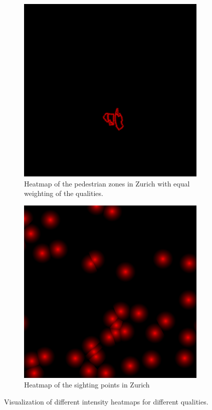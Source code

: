 \documentclass[letterpaper]{article}
\begin{document}
\begin{figure}
    \begin{subfigure}{.22\textwidth}
        \centering
        \includegraphics[width=.95\linewidth]{images/results/pedestrian_zone_heatmap_70.png}
        \caption[width=.2\textwidth]{Heatmap of the pedestrian zones in Zurich with equal weighting of the qualities.}
    \end{subfigure}%
    \begin{subfigure}{.22\textwidth}
        \centering
        \includegraphics[width=.95\linewidth]{images/results/sighting_point_heatmap_500.png}
        \caption[width=.2\textwidth]{Heatmap of the sighting points in Zurich}
    \end{subfigure}
    \caption{Visualization of different intensity heatmaps for different qualities.}
    \label{fig:ZurichSingleHeatmaps}
\end{figure}
\end{document}
